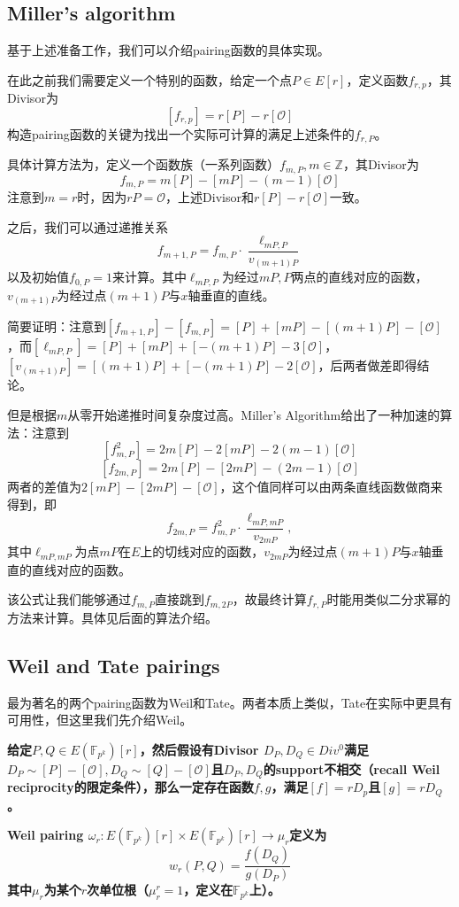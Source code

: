 \documentclass[12pt]{article}
\newcommand{\oo}{\mathcal{O}}
\newcommand{\fpk}{\mathbb{F}_{p^k}}
\begin{document}
\subsection{Miller’s algorithm}
基于上述准备工作，我们可以介绍pairing函数的具体实现。

在此之前我们需要定义一个特别的函数，给定一个点$P\in E[r]$，定义函数$f_{r,p}$，其Divisor为
$$[f_{r,p}] = r[P]-r[\oo]$$
构造pairing函数的关键为找出一个实际可计算的满足上述条件的$f_{r,P}$。

具体计算方法为，定义一个函数族（一系列函数）$f_{m,P}, m \in \mathbb{Z}$，其Divisor为
$$f_{m,P} = m[P]-[mP]-(m-1)[\oo]	$$
注意到$m=r$时，因为$rP = \oo$，上述Divisor和$r[P]-r[\oo]$一致。

之后，我们可以通过递推关系
$$ f_{m+1,P} = f_{m,P}\cdot \frac{\ell_{mP,P}}{v_{(m+1)P}}$$
以及初始值$f_{0,P}=1$来计算。其中$\ell_{mP,P}$为经过$mP,P$两点的直线对应的函数，$v_{(m+1)P}$为经过点$(m+1)P$与$x$轴垂直的直线。

简要证明：注意到$[f_{m+1,P}]-[f_{m,P}] = [P]+[mP]-[(m+1)P]-[\oo]$，而$[\ell_{mP,P}] = [P]+[mP]+[-(m+1)P]-3[\oo]$，$[v_{(m+1)P}] = [(m+1)P]+[-(m+1)P]-2[\oo]$，后两者做差即得结论。

但是根据$m$从零开始递推时间复杂度过高。Miller's Algorithm给出了一种加速的算法：注意到
$$[f^2_{m,P}] =2m[P]-2[mP]-2(m-1)[\oo]$$
$$[f_{2m,P}] = 2m[P]-[2mP]-(2m-1)[\oo] $$
两者的差值为$2[mP]-[2mP]-[\oo]$，这个值同样可以由两条直线函数做商来得到，即
$$f_{2m,P} = f^2_{m,P}\cdot \frac{\ell_{mP,mP}}{v_{2mP}},$$
其中$\ell_{mP,mP}$为点$mP$在$E$上的切线对应的函数，$v_{2mP}$为经过点$(m+1)P$与$x$轴垂直的直线对应的函数。

该公式让我们能够通过$f_{m,P}$直接跳到$f_{m,2P}$，故最终计算$f_{r,P}$时能用类似二分求幂的方法来计算。具体见后面的算法介绍。
\subsection{Weil and Tate pairings}
最为著名的两个pairing函数为Weil和Tate。两者本质上类似，Tate在实际中更具有可用性，但这里我们先介绍Weil。

\textbf{给定$P,Q \in E(\fpk)[r]$，然后假设有Divisor $D_P, D_Q \in Div^0$满足$D_P \sim [P]-[\oo], D_Q \sim [Q]-[\oo]$且$D_P, D_Q$的support不相交（recall Weil reciprocity的限定条件），那么一定存在函数$f,g$，满足$[f] = rD_p$且$[g]=rD_Q$。}

\textbf{ Weil pairing $\omega_r: E(\fpk)[r] \times E(\fpk)[r] \rightarrow \mu_r$定义为
$$ w_r(P,Q) = \frac{f(D_Q)}{g(D_P)}$$
其中$\mu_r$为某个$r$次单位根（$\mu_r^r =1$，定义在$\fpk$上）。
}
\end{document}
